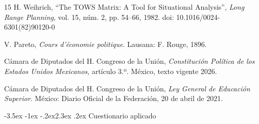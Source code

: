 \documentclass[11pt,a4paper]{article}
\makeatletter
\renewcommand\section{\@startsection{section}{1}{\z@}%
  {-3.5ex \@plus -1ex \@minus -.2ex}{2.3ex \@plus .2ex}%
  {\normalfont\Large\bfseries\color{uazblue}}}
\makeatother
\begin{document}
\begin{thebibliography}{15}
H. Weihrich, ``The TOWS Matrix: A Tool for Situational Analysis'', \textit{Long
Range Planning}, vol. 15, núm. 2, pp. 54--66, 1982.
doi: 10.1016/0024-6301(82)90120-0

V. Pareto, \textit{Cours d'économie politique}. Lausana: F. Rouge, 1896.

Cámara de Diputados del H. Congreso de la Unión, \textit{Constitución Política
de los Estados Unidos Mexicanos}, artículo 3.º. México, texto vigente 2026.

Cámara de Diputados del H. Congreso de la Unión, \textit{Ley General de
Educación Superior}. México: Diario Oficial de la Federación, 20 de abril de
2021.

\end{thebibliography}

\appendix
\section{Cuestionario aplicado}
\end{document}
